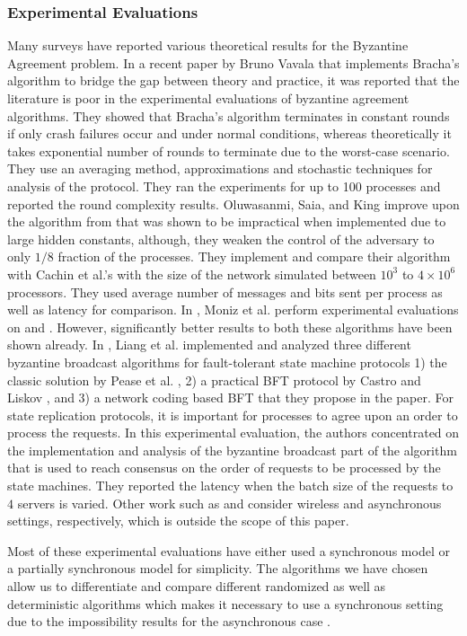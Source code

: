 \subsubsection{Experimental Evaluations}
Many surveys have reported various theoretical results for the Byzantine Agreement problem. In a recent paper by Bruno Vavala \cite{VN12} that implements Bracha's algorithm \cite{Bracha84} to bridge the gap between theory and practice, it was reported that the literature is poor in the experimental evaluations of byzantine agreement algorithms. They showed that Bracha's algorithm terminates in constant rounds if only crash failures occur and under normal conditions, whereas theoretically it takes exponential number of rounds to terminate due to the worst-case scenario. They use an averaging method, approximations and stochastic techniques for analysis of the protocol. They ran the experiments for up to 100 processes and reported the round complexity results. Oluwasanmi, Saia, and King \cite{OSK10} improve upon the algorithm from \cite{KS09} that was shown to be impractical when implemented due to large hidden constants, although, they weaken the control of the adversary to only $1/8$ fraction of the processes. They implement and compare their algorithm with Cachin et al.'s \cite{CKS05} with the size of the network simulated between $10^3$ to $4\times10^6$ processors. They used average number of messages and bits sent per process as well as latency for comparison. In \cite{MNCV06}, Moniz et al. perform experimental evaluations on \cite{Bracha84} and \cite{CKS05}. However, significantly better results to both these algorithms have been shown already. In \cite{LSV12}, Liang et al. implemented and analyzed three different byzantine broadcast algorithms for fault-tolerant state machine protocols 1) the classic solution by Pease et al. \cite{PeaseSL80}, 2) a practical BFT protocol by Castro and Liskov \cite{CL02}, and 3) a network coding based BFT that they propose in the paper. For state replication protocols, it is important for processes to agree upon an order to process the requests. In this experimental evaluation, the authors concentrated on the implementation and analysis of the byzantine broadcast part of the algorithm that is used to reach consensus on the order of requests to be processed by the state machines. They reported the latency when the batch size of the requests to $4$ servers is varied. Other work such as \cite{MNC10} and \cite{MNCV11} consider wireless and asynchronous settings, respectively, which is outside the scope of this paper.

Most of these experimental evaluations have either used a synchronous model or a partially synchronous model for simplicity. The algorithms we have chosen allow us to differentiate and compare different randomized as well as deterministic algorithms which makes it necessary to use a synchronous setting due to the impossibility results for the asynchronous case \cite{FischerLP83}. 

